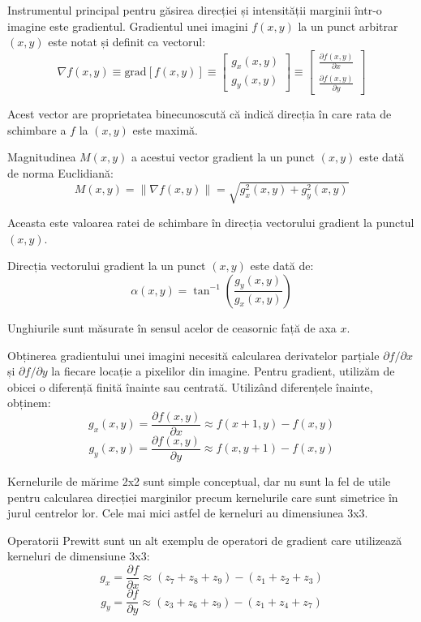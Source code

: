 \documentclass[a4paper,12pt]{report}
\begin{document}
Instrumentul principal pentru găsirea direcției și intensității marginii într-o imagine este gradientul. Gradientul unei imagini \( f(x, y) \) la un punct arbitrar \((x, y)\) este notat și definit ca vectorul:
\[
    \nabla f(x, y) \equiv \text{grad}[f(x, y)] \equiv \begin{bmatrix} g_x(x, y) \\ g_y(x, y) \end{bmatrix} \equiv \begin{bmatrix} \frac{\partial f(x, y)}{\partial x} \\ \frac{\partial f(x, y)}{\partial y} \end{bmatrix}
\]

Acest vector are proprietatea binecunoscută că indică direcția în care rata de schimbare a \( f \) la \((x, y)\) este maximă.

Magnitudinea \( M(x, y) \) a acestui vector gradient la un punct \((x, y)\) este dată de norma Euclidiană:
\[
    M(x, y) = \| \nabla f(x, y) \| = \sqrt{g_x^2(x, y) + g_y^2(x, y)}
\]

Aceasta este valoarea ratei de schimbare în direcția vectorului gradient la punctul \((x, y)\).

Direcția vectorului gradient la un punct \((x, y)\) este dată de:
\[
    \alpha(x, y) = \tan^{-1} \left( \frac{g_y(x, y)}{g_x(x, y)} \right)
\]

Unghiurile sunt măsurate în sensul acelor de ceasornic față de axa \( x \).

Obținerea gradientului unei imagini necesită calcularea derivatelor parțiale \( \partial f / \partial x \) și \( \partial f / \partial y \) la fiecare locație a pixelilor din imagine. Pentru gradient, utilizăm de obicei o diferență finită înainte sau centrată. Utilizând diferențele înainte, obținem:
\[
    g_x(x, y) = \frac{\partial f(x, y)}{\partial x} \approx f(x+1, y) - f(x, y)
\]
\[
    g_y(x, y) = \frac{\partial f(x, y)}{\partial y} \approx f(x, y+1) - f(x, y)
\]

Kernelurile de mărime 2x2 sunt simple conceptual, dar nu sunt la fel de utile pentru calcularea direcției marginilor precum kernelurile care sunt simetrice în jurul centrelor lor. Cele mai mici astfel de kerneluri au dimensiunea 3x3.

Operatorii Prewitt sunt un alt exemplu de operatori de gradient care utilizează kerneluri de dimensiune 3x3:
\[
    g_x = \frac{\partial f}{\partial x} \approx (z_7 + z_8 + z_9) - (z_1 + z_2 + z_3)
\]
\[
    g_y = \frac{\partial f}{\partial y} \approx (z_3 + z_6 + z_9) - (z_1 + z_4 + z_7)
\]
\end{document}
